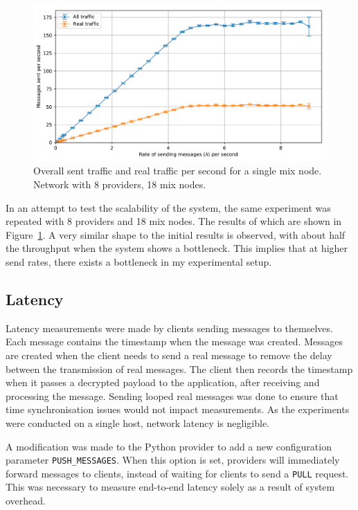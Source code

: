 \documentclass[final,dissertation.tex]{subfiles}
\begin{document}
\begin{figure}[h]
	\includegraphics[width=\linewidth]{../figs/mix_bandwidth_2}
	\caption{Overall sent traffic and real traffic per second for a single mix node. Network with 8 providers, 18 mix nodes.}
	\label{fig:mix_bandwidth_2}
\end{figure}

In an attempt to test the scalability of the system, the same experiment was repeated with 8 providers and 18 mix nodes. The results of which are shown in Figure~\ref{fig:mix_bandwidth_2}. A very similar shape to the initial results is observed, with about half the throughput when the system shows a bottleneck. This implies that at higher send rates, there exists a bottleneck in my experimental setup.

\subsection{Latency}

Latency measurements were made by clients sending messages to themselves. Each message contains the timestamp when the message was created. Messages are created when the client needs to send a real message to remove the delay between the transmission of real messages. The client then records the timestamp when it passes a decrypted payload to the application, after receiving and processing the message. Sending looped real messages was done to ensure that time synchronisation issues would not impact measurements. As the experiments were conducted on a single host, network latency is negligible.

A modification was made to the Python provider to add a new configuration parameter \verb|PUSH_MESSAGES|. When this option is set, providers will immediately forward messages to clients, instead of waiting for clients to send a \verb|PULL| request. This was necessary to measure end-to-end latency solely as a result of system overhead.
\end{document}
